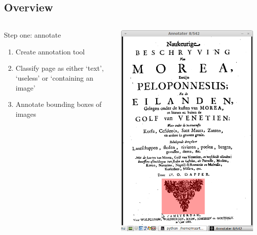 \subsection{Overview}
{
	\begin{columns}
		\begin{column}{.4\textwidth}
			Step one: annotate
			\begin{enumerate}
				\item Create annotation tool
				\item Classify page as either `text', `useless' or `containing an image'
				\item Annotate bounding boxes of images
			\end{enumerate}
		\end{column}
		\begin{column}{.6\textwidth}
			\includegraphics[width=.8\columnwidth]{resources/screenshot_annotator}
		\end{column}
	\end{columns}
}
